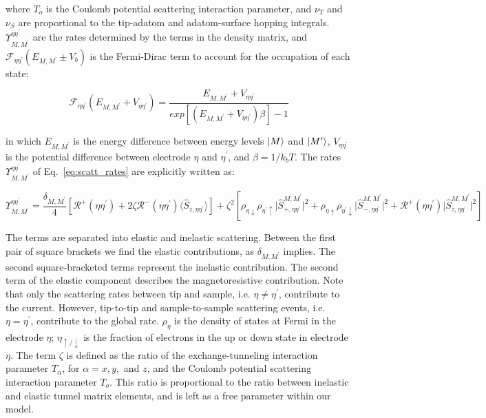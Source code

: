 \documentclass[reprint,amsmath,amssymb,aps,nofootinbib,onecolumn]{revtex4-2}
\begin{document}
where $T_{o}$ is the Coulomb potential scattering interaction parameter, and $\nu_T$ and $\nu_S$ are proportional to the tip-adatom and adatom-surface hopping integrals. 
$\Upsilon^{\eta\eta^{\prime}}_{M,M^{\prime}}$ are the rates determined by the terms in the density matrix, and $\mathcal{F}_{\eta\eta^{\prime}}(E_{M,M^{\prime}}\pm V_b )$ is the Fermi-Dirac term to account for the occupation of each state:

\begin{equation}
\mathcal{F}_{\eta\eta^{\prime}}(E_{M,M^{\prime}}+ V_{\eta \eta^{\prime}} )=\dfrac{E_{M,M^{\prime}}+ V_{\eta \eta^{\prime}}}{exp\left[\left( E_{M,M^{\prime}}+ V_{\eta \eta^{\prime}}  \right)\beta\right]-1}
\label{eq:fermi_conv}
\end{equation}

in which $E_{M,M^{\prime}}$ is the energy difference between energy levels $\ket{M}$ and $\ket{M^{\prime}}$, $V_{\eta \eta^{\prime}}$ is the potential difference between electrode $\eta$ and $\eta^{\prime}$, and $\beta=1/k_b T$. The rates $\Upsilon^{\eta\eta^{\prime}}_{M,M^{\prime}}$ of Eq.~\ref{eq:scatt_rates} are explicitly written as:

\begin{equation}
\label{eq:ups} 
    \Upsilon^{\eta\eta^{\prime}}_{M,M^{\prime}}=\dfrac{\delta_{M,M^{\prime}}}{4}\left[  \mathcal{R}^{+}(\eta\eta^{\prime})+ 2\zeta \mathcal{R}^{-}(\eta\eta^{\prime})\langle \hat{S}_{z,\eta\eta^{\prime}} \rangle \right] + \zeta^{2}\left[ \rho_{\eta \downarrow} \rho_{\eta^{\prime}\uparrow} \lvert \hat{S}_{+,\eta\eta^{\prime}}^{M,M^{\prime}}\rvert^{2} + \rho_{\eta \uparrow} \rho_{\eta^{\prime}\downarrow} \lvert {\hat{S}_{-,\eta\eta^{\prime}}^{M,M^{\prime}}}\rvert^{2} +\mathcal{R}^{+}(\eta\eta^{\prime})\lvert \hat{S}_{z,\eta\eta^{\prime}}^{M,M^{\prime}}\rvert^{2} \right]
\end{equation}

The terms are separated into elastic and inelastic scattering. Between the first pair of square brackets we find the elastic contributions, as $\delta_{M,M^{\prime}}$ implies. The second square-bracketed terms represent the inelastic contribution.
The second term of the elastic component describes the magnetoresistive contribution. Note that only the scattering rates between tip and sample, i.e. $\eta\neq\eta^{\prime}$, contribute to the current. However, tip-to-tip and sample-to-sample scattering events, i.e. $\eta=\eta^{\prime}$, contribute to the global rate. $\rho_{\eta}$ is the density of states at Fermi in the electrode $\eta$; $\eta_{\uparrow / \downarrow}$ is the fraction of electrons in the up or down state in electrode $\eta$. The term $\zeta$ is defined as the ratio of the exchange-tunneling interaction parameter $T_{\alpha}$, for $\alpha = x, y,$ and $z$, and the Coulomb potential scattering interaction parameter $T_{o}$. This ratio is proportional to the ratio between inelastic and elastic tunnel matrix elements, and is left as a free parameter within our model. 
\end{document}
